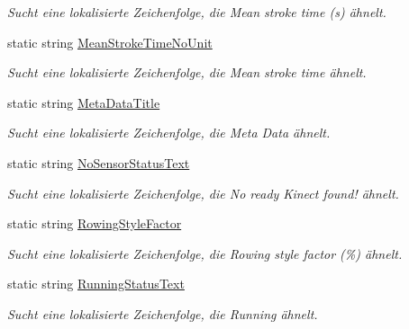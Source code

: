 \begin{DoxyCompactItemize}
\begin{DoxyCompactList}\small\item\em Sucht eine lokalisierte Zeichenfolge, die Mean stroke time (s) ähnelt. \end{DoxyCompactList}\item 
static string \hyperlink{class_rowing_monitor_1_1_properties_1_1_resources_a3abffb090ae29ce13a35ca3d226b2c6c}{Mean\+Stroke\+Time\+No\+Unit}
\begin{DoxyCompactList}\small\item\em Sucht eine lokalisierte Zeichenfolge, die Mean stroke time ähnelt. \end{DoxyCompactList}\item 
static string \hyperlink{class_rowing_monitor_1_1_properties_1_1_resources_a8d03e7ae63797c4372290c89615921a5}{Meta\+Data\+Title}
\begin{DoxyCompactList}\small\item\em Sucht eine lokalisierte Zeichenfolge, die Meta Data ähnelt. \end{DoxyCompactList}\item 
static string \hyperlink{class_rowing_monitor_1_1_properties_1_1_resources_a47a30e91e4789279914f53985bae7151}{No\+Sensor\+Status\+Text}
\begin{DoxyCompactList}\small\item\em Sucht eine lokalisierte Zeichenfolge, die No ready Kinect found! ähnelt. \end{DoxyCompactList}\item 
static string \hyperlink{class_rowing_monitor_1_1_properties_1_1_resources_abdf073638a1892c68c06325cff16f382}{Rowing\+Style\+Factor}
\begin{DoxyCompactList}\small\item\em Sucht eine lokalisierte Zeichenfolge, die Rowing style factor (\%) ähnelt. \end{DoxyCompactList}\item 
static string \hyperlink{class_rowing_monitor_1_1_properties_1_1_resources_a12657e89c9fff2bec7af3cf8caaf6093}{Running\+Status\+Text}
\begin{DoxyCompactList}\small\item\em Sucht eine lokalisierte Zeichenfolge, die Running ähnelt. \end{DoxyCompactList}\item 

\end{DoxyCompactItemize}

